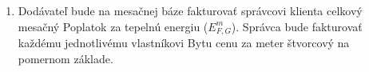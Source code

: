 \begin{enumerate}

\begin{center}
\begin{tabu}{|X|X|X|X|X|X|} \tabucline{}
{{with translate "sk" .Contract.Tables.calc_energy_fee}} %
	{{.Columns | column}} \\\tabucline{}
	{{range .Headers}} {{.|row}} \\\tabucline{} {{end}} %
	{{range .Rows}} {{.|row}} \\\tabucline{} {{end}} %
	\bfseries {{total .}} \\\tabucline{} %
{{end}}
\end{tabu}
\end{center}
	\item Dodávateľ bude na mesačnej báze fakturovať správcovi klienta celkový mesačný Poplatok za tepelnú energiu ($E^{m}_{F, G}$). Správca bude fakturovať každému jednotlivému vlastníkovi Bytu cenu za meter štvorcový na pomernom základe.
\end{enumerate}

